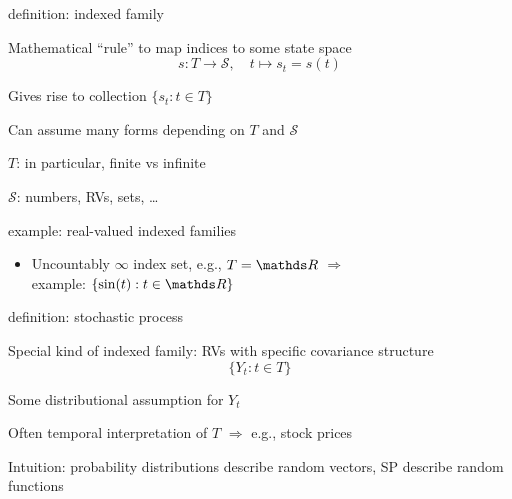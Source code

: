 \documentclass[11pt,compress,t,notes=noshow, xcolor=table]{beamer}
\begin{document}
\begin{framei}[sep=L]{definition: indexed family}
\item Mathematical ``rule'' to map indices to some state space %
$$s: T \rightarrow \mathcal{S}, \quad t \mapsto s_t = s(t) $$
\item Gives rise to collection $\{s_t: t \in T\}$
\item Can assume many forms depending on $T$ and $\mathcal{S}$
\item $T$: in particular, finite vs infinite
\item $\mathcal{S}$: numbers, RVs, sets, \dots
\end{framei}

\begin{frame}{example: real-valued indexed families}
\vfill
\begin{itemize}
\item Uncountably $\infty$ index set, e.g., $T = \R$ $\Rightarrow$ \\example: $\{\sin(t): t \in \R\}$
\end{itemize}
\end{frame}

\begin{framei}[sep=L]{definition: stochastic process}
\item Special kind of indexed family: RVs with specific covariance structure
$$\{Y_t: t \in T\}$$ 
\item Some distributional assumption for $Y_t$
\item Often temporal interpretation of $T$ $\Rightarrow$ e.g., stock prices
\item Intuition: probability distributions describe random vectors, SP describe random functions
\end{framei}
\end{document}

